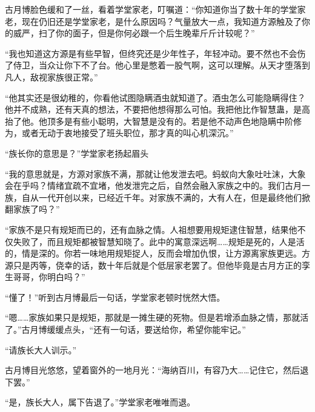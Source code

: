 \begin{this_body}
古月博脸色缓和了一丝，看着学堂家老，叮嘱道：“你知道你当了数十年的学堂家老，现在仍旧还是学堂家老，是什么原因吗？气量放大一点，我知道方源触及了你的威严，扫了你的面子，但是你何必跟一个后生晚辈斤斤计较呢？”

“我也知道这方源是有些早智，但终究还是少年性子，年轻冲动。要不然也不会伤了侍卫，当众让你下不了台。他心里是憋着一股气啊，这可以理解。从天才堕落到凡人，敌视家族很正常。”

“他其实还是很幼稚的，你看他试图隐瞒酒虫就知道了。酒虫怎么可能隐瞒得住？他并不成熟，还有天真的想法，不要把他想得那么可怕。我把他比作智慧蛊，是高抬了他。他顶多是有些小聪明，大智慧是没有的。若是他不动声色地隐瞒中阶修为，或者无动于衷地接受了班头职位，那才真的叫心机深沉。”

“族长你的意思是？”学堂家老扬起眉头

“我的意思就是，方源对家族不满，那就让他发泄去吧。蚂蚁向大象吐吐沫，大象会在乎吗？情绪宜疏不宜堵，他发泄完之后，自然会融入家族之中的。我们古月一族，自从一代开创以来，已经近千年。对家族不满的，大有人在，但是最终他们掀翻家族了吗？”

“家族不是只有规矩而已的，还有血脉之情。人祖想要用规矩逮住智慧，结果他不仅失败了，而且规矩都被智慧知晓了。此中的寓意深远啊……规矩是死的，人是活的，情是深的。你若一味地用规矩捉人，反而会增加仇恨，让方源离家族更远。方源只是丙等，侥幸的话，数十年后就是个低层家老罢了。但他毕竟是古月方正的孪生哥哥，你明白吗？”

“懂了！”听到古月博最后一句话，学堂家老顿时恍然大悟。

“嗯……家族如果只是规矩，那就是一摊生硬的死物。但是若增添血脉之情，那就活了。”古月博缓缓点头，“还有一句话，要送给你，希望你能牢记。”

“请族长大人训示。”

古月博目光悠悠，望着窗外的一地月光：“海纳百川，有容乃大……记住它，然后退下罢。”

“是，族长大人，属下告退了。”学堂家老唯唯而退。

\end{this_body}

